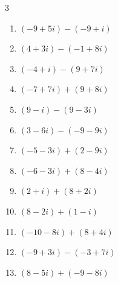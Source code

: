 \begin{multicols}{3}
\begin{enumerate}
        \phantom{$\displaystyle =5-15i$}

  \item $\displaystyle (-9+5i) - (-9+i)$

        \phantom{$\displaystyle =4i$}

  \item $\displaystyle (4+3i) - (-1+8i)$

        \phantom{$\displaystyle =5-5i$}

  \item $\displaystyle (-4+i) - (9+7i)$

        \phantom{$\displaystyle =-13-6i$}

  \item $\displaystyle (-7+7i) + (9+8i)$

        \phantom{$\displaystyle =2+15i$}

  \item $\displaystyle (9-i) - (9-3i)$

        \phantom{$\displaystyle =2i$}

  \item $\displaystyle (3-6i) - (-9-9i)$

        \phantom{$\displaystyle =12+3i$}

  \item $\displaystyle (-5-3i) + (2-9i)$

        \phantom{$\displaystyle =-3-12i$}

  \item $\displaystyle (-6-3i) + (8-4i)$

        \phantom{$\displaystyle =2-7i$}

  \item $\displaystyle (2+i) + (8+2i)$

        \phantom{$\displaystyle =10+3i$}

  \item $\displaystyle (8-2i) + (1-i)$

        \phantom{$\displaystyle =9-3i$}

  \item $\displaystyle (-10-8i) + (8+4i)$

        \phantom{$\displaystyle =-2-4i$}

  \item $\displaystyle (-9+3i) - (-3+7i)$

        \phantom{$\displaystyle =-6-4i$}

  \item $\displaystyle (8-5i) + (-9-8i)$


\end{enumerate}
\end{multicols}
